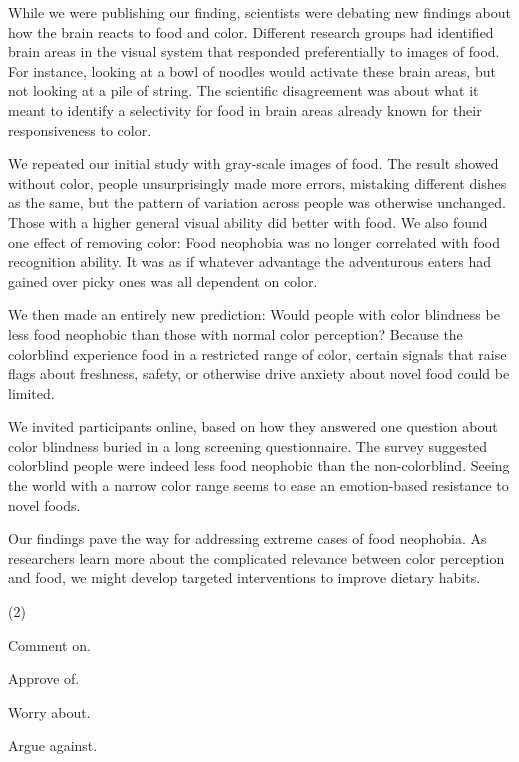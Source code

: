 \documentclass{英语试卷}
\begin{document}
\par While we were publishing our finding, scientists were debating new findings about how the brain reacts to food and color. Different research groups had identified brain areas in the visual system that responded preferentially to images of food. For instance, looking at a bowl of noodles would activate these brain areas, but not looking at a pile of string. The scientific disagreement was about what it meant to identify a selectivity for food in brain areas already known for their responsiveness to color.\par
\par We repeated our initial study with gray-scale images of food. The result showed without color, people unsurprisingly made more errors, mistaking different dishes as the same, but the pattern of variation across people was otherwise unchanged. Those with a higher general visual ability did better with food. We also found one effect of removing color: Food neophobia was no longer correlated with food recognition ability. It was as if whatever advantage the adventurous eaters had gained over picky ones was all dependent on color.\par
\par We then made an entirely new prediction: Would people with color blindness be less food neophobic than those with normal color perception? Because the colorblind experience food in a restricted range of color, certain signals that raise flags about freshness, safety, or otherwise drive anxiety about novel food could be limited.\par
\par We invited participants online, based on how they answered one question about color blindness buried in a long screening questionnaire. The survey suggested colorblind people were indeed less food neophobic than the non-colorblind. Seeing the world with a narrow color range seems to ease an emotion-based resistance to novel foods.\par
\par Our findings pave the way for addressing extreme cases of food neophobia. As researchers learn more about the complicated relevance between color perception and food, we might develop targeted interventions to improve dietary habits.\par
{}
\begin{choices}(2)
  \item Comment on.
  \item Approve of.
  \item Worry about.
  \item Argue against.
\end{choices}
\end{document}
